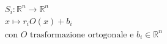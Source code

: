 \documentclass[preview]{standalone}
\begin{document}
\begin{align*}
S_i: \mathbb{R}^n \rightarrow \mathbb{R}^n \\ x \mapsto r_i O(x) + b_i \\ \text{con } O \text{ trasformazione ortogonale e } b_i \in \mathbb{R}^n
\end{align*}
\end{document}
